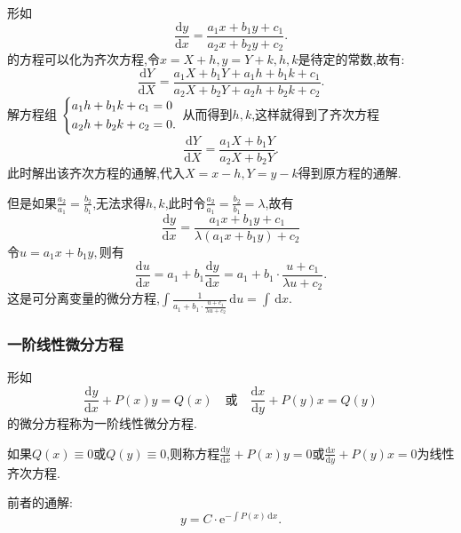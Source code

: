 形如
\begin{equation*}
    \frac{\mathrm{d} y}{\mathrm{d} x} =\frac{a_1x+b_1y+c_1}{a_2x+b_2y+c_2}.
\end{equation*}
的方程可以化为齐次方程,令$x=X+h,y=Y+k,h,k$是待定的常数,故有:
\begin{equation*}
    \frac{\mathrm{d} Y}{\mathrm{d} X} =\frac{a_1X+b_1Y+a_1h+b_1k+c_1}{a_2X+b_2Y+a_2h+b_2k+c_2}.
\end{equation*}
解方程组
$\begin{dcases}
    a_1h+b_1k+c_1=0\\
    a_2h+b_2k+c_2=0.
\end{dcases}$
从而得到$h,k$,这样就得到了齐次方程
\begin{equation*}
    \frac{\mathrm{d} Y}{\mathrm{d} X} =\frac{a_1X+b_1Y}{a_2X+b_2Y}.
\end{equation*}
此时解出该齐次方程的通解,代入$X=x-h,Y=y-k$得到原方程的通解.

但是如果$\frac{a_2}{a_1}=\frac{b_2}{b_1}$,无法求得$h,k$,此时令$\frac{a_2}{a_1}=\frac{b_2}{b_1}=\lambda$,故有
\begin{equation*}
    \frac{\mathrm{d} y}{\mathrm{d} x} =\frac{a_1x+b_1y+c_1}{\lambda(a_1x+b_1y)+c_2}
\end{equation*}
令$u=a_1x+b_1y,$则有
\begin{equation*}
    \frac{\mathrm{d} u}{\mathrm{d} x} =a_1+b_1 \frac{\mathrm{d} y}{\mathrm{d} x} =a_1+b_1\cdot \frac{u+c_1}{\lambda u+c_2}.
\end{equation*}这是可分离变量的微分方程,$\int \frac{1}{a_1+b_1\cdot \frac{u+c_1}{\lambda u+c_2}} \,\mathrm{d}u =\int  \,\mathrm{d}x .$

\subsubsection{一阶线性微分方程}
形如
\begin{equation*}
    \frac{\mathrm{d} y}{\mathrm{d} x} + P(x)y = Q(x) \quad \text{或} \quad \frac{\mathrm{d} x}{\mathrm{d} y} +P(y)x = Q(y)
\end{equation*}
的微分方程称为一阶线性微分方程.

如果$Q(x)\equiv 0 \text{或}Q(y)\equiv 0$,则称方程$\frac{\mathrm{d} y}{\mathrm{d} x} + P(x)y = 0 \text{或} \frac{\mathrm{d} x}{\mathrm{d} y} +P(y)x = 0$为线性齐次方程.

前者的通解:
\begin{equation*}
    y=C\cdot \mathrm{e}^{-\int P(x) \,\mathrm{d}x }.
\end{equation*}

